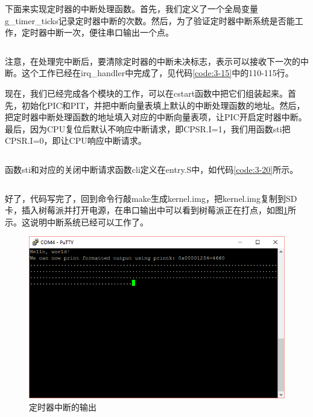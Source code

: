 \documentclass[main.tex]{subfiles}
\begin{document}
\begin{CJK*}{UTF8}{song}
下面来实现定时器的中断处理函数。首先，我们定义了一个全局变量g\_timer\_ticks记录定时器中断的次数。然后，为了验证定时器中断系统是否能工作，定时器中断一次，便往串口输出一个点。

\begin{code}
\label{code:3-18}
\inputminted[firstline=3,lastline=23,linenos,numbersep=5pt,frame=lines,framesep=2mm]{c}{src/chapter03/kernel/kernel.c}
\end{code}

注意，在处理完中断后，要清除定时器的中断未决标志，表示可以接收下一次的中断。这个工作已经在irq\_handler中完成了，见代码\ref{code:3-15}中的110-115行。

\par
现在，我们已经完成各个模块的工作，可以在cstart函数中把它们组装起来。首先，初始化PIC和PIT，并把中断向量表填上默认的中断处理函数的地址。然后，把定时器中断处理函数的地址填入对应的中断向量表项，让PIC开启定时器中断。最后，因为CPU复位后默认不响应中断请求，即CPSR.I=1，我们用函数sti把CPSR.I=0，即让CPU响应中断请求。

\begin{code}
\label{code:3-19}
\inputminted[firstline=135,lastline=166,linenos,numbersep=5pt,frame=lines,framesep=2mm]{c}{src/chapter03/kernel/machdep.c}
\end{code}

函数sti和对应的关闭中断请求函数cli定义在entry.S中，如代码\ref{code:3-20}所示。

\begin{code}
\label{code:3-20}
\inputminted[firstline=153,lastline=166,linenos,numbersep=5pt,frame=lines,framesep=2mm]{gas}{src/chapter03/kernel/entry.S}
\end{code}

好了，代码写完了，回到命令行敲make生成kernel.img，把kernel.img复制到SD卡，插入树莓派并打开电源，在串口输出中可以看到树莓派正在打点，如图\ref{figure:3-6}所示。这说明中断系统已经可以工作了。

\begin{figure}[htp]
\centering
\includegraphics[scale=0.4]{figures/3-6.png}
\caption{定时器中断的输出}
\label{figure:3-6}
\end{figure}

\clearpage
\ifxetex\else
\end{CJK*}
\fi
\end{document}
